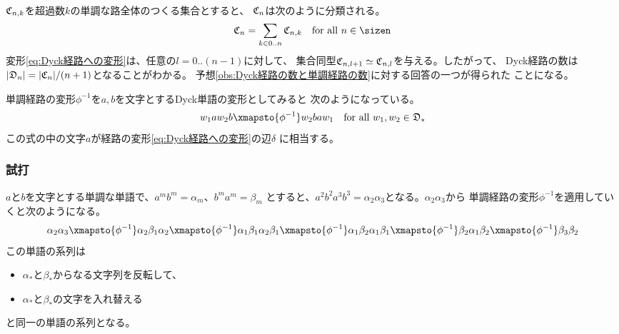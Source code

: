 {\begin{equation*}
\begin{split}
{		}
	\end{split}\end{equation*}
	${\mathfrak C}_{n,k}$を超過数$k$の単調な路全体のつくる集合とすると、
	${\mathfrak C}_n$は次のように分類される。
	\begin{equation*}\begin{split}
		\Cyck_n = \sum_{k\in0..n}\Cyck_{n,k} \quad\text{for all } n\in\sizen
	\end{split}\end{equation*}
	変形\eqref{eq:Dyck経路への変形}は、任意の$l=0..(n-1)$に対して、
	集合同型${\mathfrak C}_{n,l+1}\simeq{\mathfrak C}_{n,l}$を与える。したがって、
	Dyck経路の数は$|{\mathfrak D}_n|=|{\mathfrak C}_n|/(n+1)$となることがわかる。
	予想\ref{obs:Dyck経路の数と単調経路の数}に対する回答の一つが得られた
	ことになる。

	単調経路の変形$\phi^{-1}$を$a,b$を文字とするDyck単語の変形としてみると
	次のようになっている。
	\begin{equation*}\begin{split}
		w_1aw_2b \xmapsto{\phi^{-1}} w_2baw_1
		\quad\text{for all } w_1,w_2\in\Dyck_*
	\end{split}\end{equation*}
	この式の中の文字$a$が経路の変形\eqref{eq:Dyck経路への変形}の辺$\delta$
	に相当する。

\subsubsection{試打}\label{s3:試打} %
	$a$と$b$を文字とする単調な単語で、$a^mb^m=\alpha_m$、$b^ma^m=\beta_m$
	とすると、$a^2b^2a^3b^3=\alpha_2\alpha_3$となる。$\alpha_2\alpha_3$から
	単調経路の変形$\phi^{-1}$を適用していくと次のようになる。
	\begin{equation*}\begin{split}
		\alpha_2\alpha_3 \xmapsto{\phi^{-1}} \alpha_2\beta_1\alpha_2
		\xmapsto{\phi^{-1}} \alpha_1\beta_1\alpha_2\beta_1
		\xmapsto{\phi^{-1}} \alpha_1\beta_2\alpha_1\beta_1
		\xmapsto{\phi^{-1}} \beta_2\alpha_1\beta_2
		\xmapsto{\phi^{-1}} \beta_3\beta_2
	\end{split}\end{equation*}
	この単語の系列は
	\begin{itemize}\setlength{\itemsep}{-1mm} %
		\item $\alpha_*$と$\beta_*$からなる文字列を反転して、
		\item $\alpha_*$と$\beta_*$の文字を入れ替える
	\end{itemize} %
	と同一の単語の系列となる。

}
